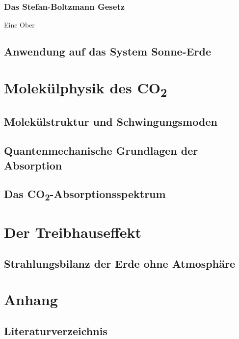 \documentclass[12pt,a4paper]{article}
\begin{document}
\subsubsection{Das Stefan-Boltzmann Gesetz}
Eine Ober


\subsection{Anwendung auf das System Sonne-Erde}

\section{Molekülphysik des CO\textsubscript{2}}

\subsection{Molekülstruktur und Schwingungsmoden}

\subsection{Quantenmechanische Grundlagen der Absorption}

\subsection{Das CO\textsubscript{2}-Absorptionsspektrum}

\section{Der Treibhauseffekt}

\subsection{Strahlungsbilanz der Erde ohne Atmosphäre}

\newpage
\section{Anhang}

\subsection{Literaturverzeichnis}
\printbibliography[heading=none]

\end{document}
